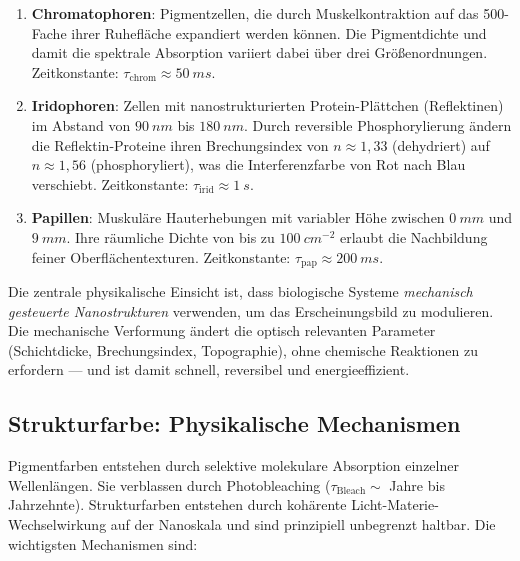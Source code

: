 ﻿\documentclass[a4paper,12pt]{article}
\theoremstyle{definition}
\begin{document}
	\begin{enumerate}[leftmargin=*, label=\textbf{\arabic*.}]
		\item \textbf{Chromatophoren}: Pigmentzellen, die durch Muskelkontraktion auf
		das 500-Fache ihrer Ruhe\-fläche expandiert werden können. Die Pigmentdichte
		und damit die spektrale Absorption variiert dabei über drei Größenordnungen.
		Zeitkonstante: $\tau_\mathrm{chrom} \approx \SI{50}{ms}$.
		
		\item \textbf{Iridophoren}: Zellen mit nanostrukturierten Protein-Plättchen
		(Reflektinen) im Abstand von $\SI{90}{nm}$ bis $\SI{180}{nm}$. Durch
		reversible Phosphorylierung ändern die Reflektin-Proteine ihren Brechungsindex
		von $n \approx 1{,}33$ (dehydriert) auf $n \approx 1{,}56$ (phosphoryliert),
		was die Interferenzfarbe von Rot nach Blau verschiebt.
		Zeitkonstante: $\tau_\mathrm{irid} \approx \SI{1}{s}$.
		
		\item \textbf{Papillen}: Muskuläre Hauterhebungen mit variabler Höhe zwischen
		$\SI{0}{mm}$ und $\SI{9}{mm}$. Ihre räumliche Dichte von bis zu
		$\SI{100}{cm^{-2}}$ erlaubt die Nachbildung feiner Oberflächentexturen.
		Zeitkonstante: $\tau_\mathrm{pap} \approx \SI{200}{ms}$.
	\end{enumerate}
	
	Die zentrale physikalische Einsicht ist, dass biologische Systeme
	\emph{mechanisch gesteuerte Nanostrukturen} verwenden, um das Erscheinungsbild
	zu modulieren. Die mechanische Verformung ändert die optisch relevanten
	Parameter (Schichtdicke, Brechungsindex, Topographie), ohne chemische
	Reaktionen zu erfordern --- und ist damit schnell, reversibel und energieeffizient.
	
	\subsection{Strukturfarbe: Physikalische Mechanismen}
	\label{ssec:strukturfarbe}
	
	Pigmentfarben entstehen durch selektive molekulare Absorption einzelner
	Wellenlängen. Sie verblassen durch Photobleaching ($\tau_\mathrm{Bleach} \sim$
	Jahre bis Jahrzehnte). Strukturfarben entstehen durch kohärente
	Licht-Materie-Wechselwirkung auf der Nanoskala und sind
	prinzipiell unbegrenzt haltbar. Die wichtigsten Mechanismen sind:
	
\end{document}
